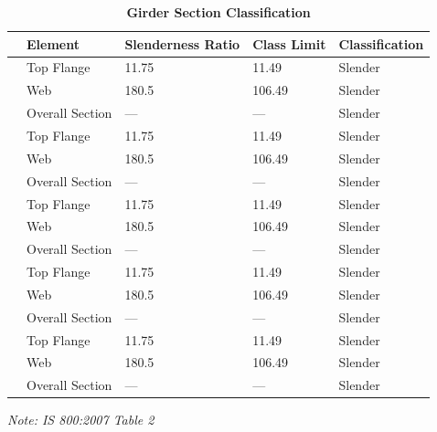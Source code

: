 \documentclass[12pt,a4paper]{report}
\numberwithin{table}{chapter}
\numberwithin{figure}{chapter}
\begin{document}
\vspace{1em}
\begin{longtable}{|C{2.5cm}|L{3cm}|C{3.5cm}|C{2.5cm}|>{\centering\arraybackslash}p{4.0cm}|}
\caption{\textbf{Girder Section Classification}}
\hline
\textbf{} & \textbf{Element} & \textbf{Slenderness Ratio} & \textbf{Class Limit} & \textbf{Classification} \\[6pt]
\hline
{} & Top Flange & 11.75 & 11.49 & Slender \\[6pt]
 & Web & 180.5 & 106.49 & Slender \\[6pt]
 & Overall Section & --- & --- & Slender \\[6pt]
\hline
{} & Top Flange & 11.75 & 11.49 & Slender \\[6pt]
 & Web & 180.5 & 106.49 & Slender \\[6pt]
 & Overall Section & --- & --- & Slender \\[6pt]
\hline
{} & Top Flange & 11.75 & 11.49 & Slender \\[6pt]
 & Web & 180.5 & 106.49 & Slender \\[6pt]
 & Overall Section & --- & --- & Slender \\[6pt]
\hline
{} & Top Flange & 11.75 & 11.49 & Slender \\[6pt]
 & Web & 180.5 & 106.49 & Slender \\[6pt]
 & Overall Section & --- & --- & Slender \\[6pt]
\hline
{} & Top Flange & 11.75 & 11.49 & Slender \\[6pt]
 & Web & 180.5 & 106.49 & Slender \\[6pt]
 & Overall Section & --- & --- & Slender \\[6pt]
\hline
\end{longtable}
\noindent\textit{Note: IS 800:2007 Table 2}
\end{document}
